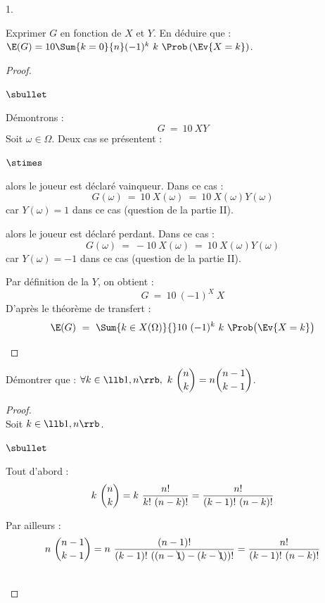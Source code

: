 \documentclass[11pt]{article}%
\begin{document}
\begin{noliste}{1.}
  \setlength{\itemsep}{4mm}
\item Exprimer $G$ en fonction de $X$ et $Y$. En déduire que : $\E(G)
  = 10 \Sum{k = 0}{n} (-1)^{k} \ k \ \Prob\left(\Ev{X = k}\right)$.

  \begin{proof}~%
    \begin{noliste}{$\sbullet$}
    \item Démontrons : 
      \[
      G \ = \ 10 \ XY
      \]
      Soit $\omega \in \Omega$. Deux cas se présentent :
      \begin{noliste}{$\stimes$}
      \item {} alors le joueur est
        déclaré vainqueur. Dans ce cas :
        \[
        G(\omega) \ = \ 10 \ X(\omega) \ = \ 10 \ X(\omega) Y(\omega) 
        \]
        car $Y(\omega) = 1$ dans ce cas (\cf question  de
        la partie II).

      \item {} alors le joueur est
        déclaré perdant. Dans ce cas :
        \[
        G(\omega) \ = \ -10 \ X(\omega) \ = \ 10 \ X(\omega) Y(\omega) 
        \]
        car $Y(\omega) = -1$ dans ce cas (\cf question  de
        la partie II).
      \end{noliste}

    \item Par définition de la \var $Y$, on obtient : 
      \[
      G \ = \ 10 \ (-1)^X \ X
      \]
      D'après le théorème de transfert :
      \[
      \E(G) \ = \ \Sum{k \in X(\Omega)}{} 10 \ (-1)^k \ k \ \Prob\big(
      \Ev{X = k} \big)
      \]
    \end{noliste}




  \end{proof}




\item Démontrer que : $\forall k \in \llb 1, n\rrb, \ k \
  \dbinom{n}{k} = n \dbinom{n-1}{k-1}$.

  \begin{proof}~\\%
    Soit $k \in \llb 1, n \rrb$.
    \begin{noliste}{$\sbullet$}
    \item Tout d'abord :
      \[
      k \ \dbinom{n}{k} = k \ \dfrac{n!}{k! \ (n-k)!} =
      \dfrac{n!}{(k-1)! \ (n-k)!}
      \]
    \item Par ailleurs :
      \[
      n \ \dbinom{n-1}{k-1} = n \ \dfrac{(n-1)!}{(k-1)! \
        ((n-\bcancel{1})-(k-\bcancel{1}))!} = \dfrac{n!}{(k-1)! \
        (n-k)!}
      \]
      \conc{Ainsi : $\forall k \in \llb 1, n \rrb$, $k \ \dbinom{n}{k}
        = n \ \dbinom{n-1}{k-1}$.}
    \end{noliste}
    ~\\[-1.4cm]
  \end{proof}


\end{noliste}
\end{document}
